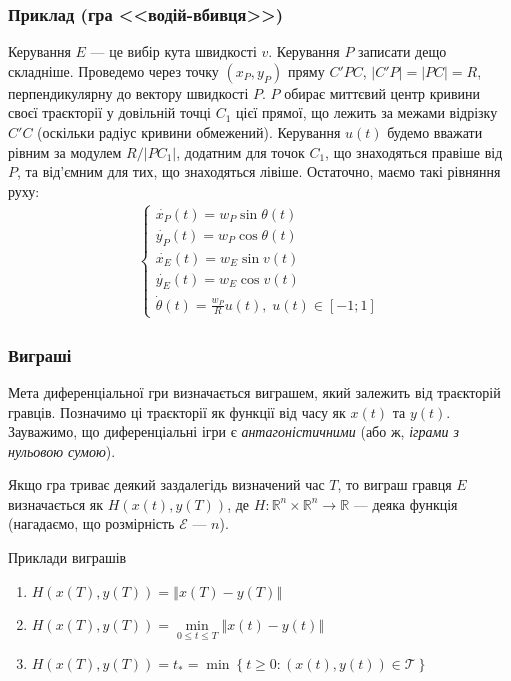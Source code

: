 \documentclass[10pt,pdf,aspectratio=169]{beamer}
\newcommand{\R}{\mathbb{R}}
\renewcommand{\d}[1]{\dot{#1}}
\newcommand{\E}{\mathcal{E}}
\newcommand{\T}{\mathcal{T}}
\renewcommand{\l}{\left}
\renewcommand{\r}{\right}
\newcommand{\norm}[1]{\left\Vert #1 \right\Vert}
\begin{document}
    \begin{frame}
        \frametitle{Приклад (гра <<водій-вбивця>>)}
        Керування $E$ --- це вибір кута швидкості $v$. Керування $P$ записати дещо складніше. Проведемо через точку $(x_P, y_P)$
        пряму $C' P C$, $|C' P| = |P C| = R$, перпендикулярну до вектору швидкості $P$. $P$ обирає миттєвий центр кривини своєї траєкторії у довільній точці $C_1$ цієї
        прямої, що лежить за межами відрізку $C' C$ (оскільки радіус кривини обмежений). Керування $u(t)$ будемо вважати рівним за модулем
        $R / |P C_1|$, додатним для точок $C_1$, що знаходяться правіше від $P$, та від'ємним для тих, що знаходяться лівіше. Остаточно, маємо такі рівняння руху:
        \begin{gather*}
            \begin{cases}
                \d{x_P}(t) = w_P \sin \theta(t) \\
                \d{y_P}(t) = w_P \cos \theta(t) \\
                \d{x_E}(t) = w_E \sin v(t) \\
                \d{y_E}(t) = w_E \cos v(t) \\
                \d{\theta}(t) = \frac{w_P}{R} u(t), \; u(t) \in [-1; 1]
            \end{cases}
        \end{gather*}
    \end{frame}
    \begin{frame}
        \frametitle{Виграші}
    
        Мета диференціальної гри визначається виграшем, який залежить від траєкторій гравців. 
        Позначимо ці траєкторії як функції від часу як $x(t)$ та $y(t)$. 
        Зауважимо, що диференціальні ігри є \emph{антагоністичними} (або ж, \emph{іграми з нульовою сумою}).

        Якщо гра триває деякий заздалегідь визначений час $T$, то виграш гравця $E$ визначається
        як $H(x(t), y(T))$, де $H : \R^n \times \R^n \to \R$ --- деяка функція (нагадаємо, що розмірність $\E$ --- $n$).

        \begin{block}{Приклади виграшів}
            \begin{enumerate}
                \item $H(x(T), y(T)) = \norm{x(T) - y(T)}$
                \item $H(x(T), y(T)) = \underset{0 \leq t \leq T}{\min} \norm{x(t) - y(t)}$
                \item $H(x(T), y(T)) = t_* = \min \l\{ t \geq 0 : (x(t), y(t)) \in \T\r\}$
            \end{enumerate}
        \end{block}
    \end{frame}
\end{document}
